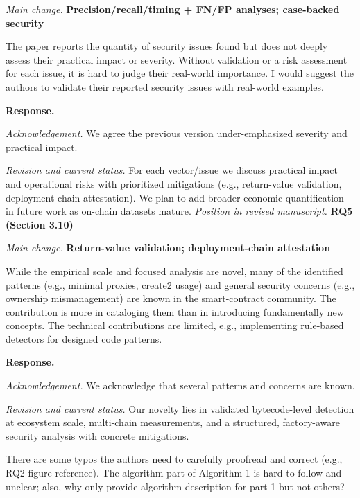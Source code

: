 \documentclass[acmsmall]{acmart}
\begin{document}
	\textit{Main change.} {\color{blue}\textbf{Precision/recall/timing + FN/FP analyses; case-backed security}}

	\begin{tcolorbox}
		[commentbox,title=Reviewer \#4 -- Comment 3] The paper reports the quantity of security issues
		found but does not deeply assess their practical impact or severity. Without validation or a
		risk assessment for each issue, it is hard to judge their real-world importance. I would
		suggest the authors to validate their reported security issues with real-world examples.
	\end{tcolorbox}

	\noindent
	\textbf{Response.}

	\textit{Acknowledgement.} We agree the previous version under-emphasized severity and practical
	impact.

	\textit{Revision and current status.} For each vector/issue we discuss practical impact and operational
	risks with prioritized mitigations (e.g., return-value validation, deployment-chain attestation).
	We plan to add broader economic quantification in future work as on-chain datasets mature.
	\textit{Position in revised manuscript.} {\color{red}\textbf{RQ5 (Section 3.10)}}

	\textit{Main change.} {\color{blue}\textbf{Return-value validation; deployment-chain attestation}}

	\begin{tcolorbox}
		[commentbox,title=Reviewer \#4 -- Comment 4] While the empirical scale and focused analysis are
		novel, many of the identified patterns (e.g., minimal proxies, create2 usage) and general security
		concerns (e.g., ownership mismanagement) are known in the smart-contract community. The
		contribution is more in cataloging them than in introducing fundamentally new concepts. The technical
		contributions are limited, e.g., implementing rule-based detectors for designed code
		patterns.
	\end{tcolorbox}

	\noindent
	\textbf{Response.}

	\textit{Acknowledgement.} We acknowledge that several patterns and concerns are known.

	\textit{Revision and current status.} Our novelty lies in validated bytecode-level detection at ecosystem
	scale, multi-chain measurements, and a structured, factory-aware security analysis with concrete
	mitigations.

	\begin{tcolorbox}
		[commentbox,title=Reviewer \#4 -- Comment 5] There are some typos the authors need to carefully
		proofread and correct (e.g., RQ2 figure reference). The algorithm part of Algorithm-1 is
		hard to follow and unclear; also, why only provide algorithm description for part-1 but not
		others?
	\end{tcolorbox}
\end{document}
